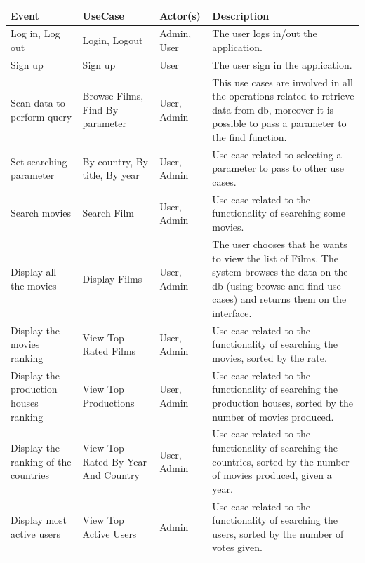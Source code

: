 \documentclass[a4paper, oneside]{article}
\begin{document}
\begin{table}[h]
\centering
\begin{tabular}{p{}p{}lp{}}

\hline
\textbf{Event} & \textbf{UseCase} & \textbf{Actor(s)} & \textbf{Description}\\ \hline
Log in, Log out & Login,  Logout & Admin, User & The user logs in/out the application.\\ \hline

Sign up & Sign up & User & The user sign in the application.\\ \hline

Scan data to perform query & Browse Films, Find By parameter & User, Admin & This use cases are involved in all the operations related to retrieve data from db, moreover it is possible to pass a parameter to the find function. \\ \hline

Set searching parameter &  By country, By title, By year & User, Admin & Use case related to selecting a parameter to pass to other use cases.\\ \hline

Search movies & Search Film & User, Admin & Use case related to the functionality of searching some movies.\\ \hline

Display all the movies & Display Films & User, Admin & The user chooses that he wants to view the list of Films. The system browses the data on the db (using browse and find use cases) and returns them on the interface.\\ \hline

Display the movies ranking & View Top Rated Films & User, Admin & Use case related to the functionality of searching the movies, sorted by the rate. \\ \hline

Display the production houses ranking & View Top Productions & User, Admin & Use case related to the functionality of searching the production houses, sorted by the number of movies produced. \\ \hline

Display the ranking of the countries & View Top Rated  By Year And Country & User, Admin & Use case related to the functionality of searching the countries, sorted by the number of movies produced, given a year. \\ \hline

Display most active users & View Top Active Users & Admin & Use case related to the functionality of searching the users, sorted by the number of votes given.\\ \hline


\end{tabular}
\end{table}
\end{document}
